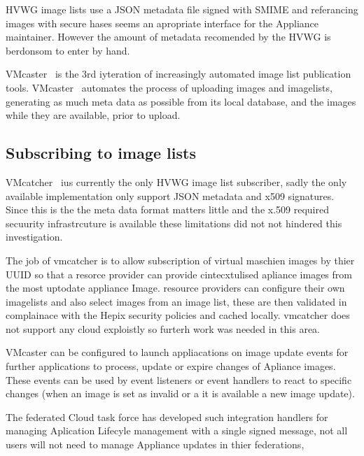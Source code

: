 \documentclass{llncs_Ibergrid2013}
\begin{document}
HVWG image lists use a JSON metadata file signed with SMIME and referancing images with secure hases seems an apropriate interface for the Appliance maintainer. However the amount of metadata recomended by the HVWG is berdonsom to enter by hand.
 
VMcaster~\cite{vmcaster} is the 3rd iyteration of increasingly automated image list publication tools. VMcaster~\cite{vmcaster} automates the process of uploading images and imagelists, generating as much meta data as possible from its local database, and the images while they are available, prior to upload.

\subsection{Subscribing to image lists}

VMcatcher~\cite{vmcatcher} ius currently the only HVWG image list subscriber, sadly the only available implementation only support JSON metadata and x509 signatures. Since this is the the meta data format matters little and the x.509 required secuurity infrastrcuture is available these limitations did not not hindered this investigation.

The job of vmcatcher is to allow subscription of virtual maschien images by thier UUID so that a resorce provider can provide cintecxtulised apliance images from the most uptodate appliance Image. resource providers can configure their own imagelists and also select images from an image list, these are then validated in complainace with the Hepix security policies and cached locally. vmcatcher does not support any cloud exploistly so furterh work was needed in this area.

VMcaster can be configured to launch appliacations on image update events for further applications to process, update or expire changes of Apliance images.  These events can be used by event listeners or event handlers to react to specific changes (when an image is set as invalid or a it is available a new image update). 

The federated Cloud task force has developed such integration handlers for managing Aplication Lifecyle management with a single signed message, not all users will not need to manage Appliance updates in thier federations,
\end{document}
